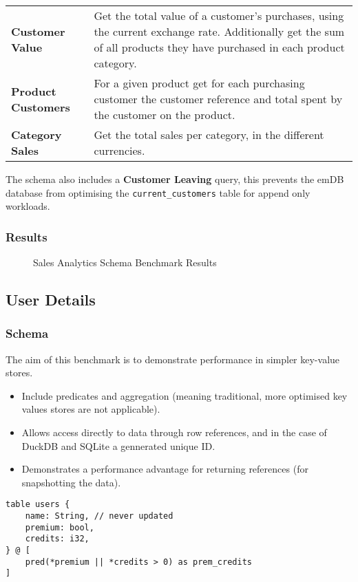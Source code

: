 \begin{center}
    \begin{tabular}{l p{}}
        \textbf{Customer Value} & Get the total value of a customer's purchases, using the current exchange
         rate. Additionally get the sum of all products they have purchased in each product category. \\
        \textbf{Product Customers} & For a given product get for each purchasing customer the customer reference and total spent by the customer on the product. \\
        \textbf{Category Sales}     &  Get the total sales per category, in the different currencies. \\
    \end{tabular}
\end{center}
\noindent
The schema also includes a \textbf{Customer Leaving} query, this prevents the emDB database from optimising the \texttt{current_customers} table for append only workloads.
\subsubsection{Results}
\begin{figure}[h!]
    \centering
    \vspace{-0.4em}
    \resizebox{\textwidth}{!}{}
    \caption{Sales Analytics Schema Benchmark Results}
    \label{fig:sales_analysis_access_queries}
\end{figure}
\subsection{User Details}
\subsubsection{Schema}
The aim of this benchmark is to demonstrate performance in simpler key-value stores.
\begin{itemize}
    \setlength\itemsep{0em}
    \item Include predicates and aggregation (meaning traditional, more optimised key values stores are not applicable).
    \item Allows access directly to data through row references, and in the case of DuckDB and SQLite a gennerated unique ID.
    \item Demonstrates a performance advantage for returning references (for snapshotting the data).
\end{itemize}
\begin{verbatim}
table users {
    name: String, // never updated
    premium: bool,
    credits: i32,
} @ [
    pred(*premium || *credits > 0) as prem_credits
]
\end{verbatim}
